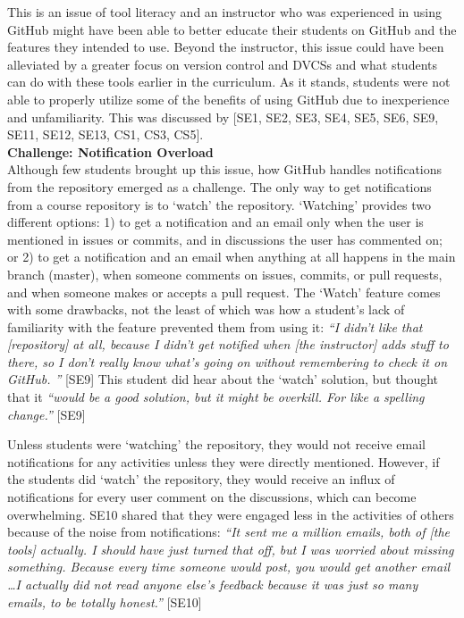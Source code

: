 

This is an issue of tool literacy and an instructor who was experienced in using GitHub might have been able to better educate their students on GitHub and the features they intended to use. Beyond the instructor, this issue could have been alleviated by a greater focus on version control and DVCSs and what students can do with these tools earlier in the curriculum. As it stands, students were not able to properly utilize some of the benefits of using GitHub due to inexperience and unfamiliarity. This was discussed by [SE1, SE2, SE3, SE4, SE5, SE6, SE9, SE11, SE12, SE13, CS1, CS3, CS5]. \\

\textbf{Challenge: Notification Overload} \\
Although few students brought up this issue, how GitHub handles notifications from the repository emerged as a challenge. The only way to get notifications from a course repository is to `watch' the repository. `Watching' provides two different options: 1) to get a notification and an email only when the user is mentioned in issues or commits, and in discussions the user has commented on; or 2) to get a notification and an email when anything at all happens in the main branch (master), when someone comments on issues, commits, or pull requests, and when someone makes or accepts a pull request. The `Watch' feature comes with some drawbacks, not the least of which was how a student's lack of familiarity with the feature prevented them from using it: \textit{``I didn't like that [repository] at all, because I didn't get notified when [the instructor] adds stuff to there, so I don't really know what's going on without remembering to check it on GitHub. ''} [SE9] This student did hear about the `watch' solution, but thought that it \textit{``would be a good solution, but it might be overkill. For like a spelling change.''} [SE9]

Unless students were `watching' the repository, they would not receive email notifications for any activities unless they were directly mentioned. However, if the students did `watch' the repository, they would receive an influx of notifications for every user comment on the discussions, which can become overwhelming. SE10 shared that they were engaged less in the activities of others because of the noise from notifications: \textit{``It sent me a million emails, both of [the tools] actually. I should have just turned that off, but I was worried about missing something. Because every time someone would post, you would get another email \ldots I actually did not read anyone else's feedback because it was just so many emails, to be totally honest.''} [SE10]

